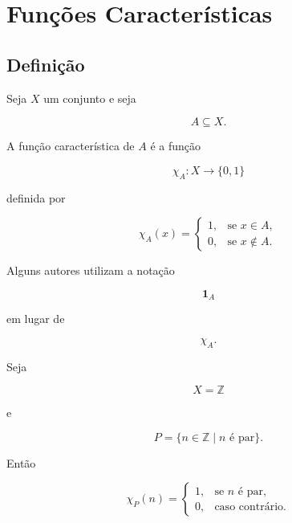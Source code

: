 \documentclass[../../main]{subfiles}
\begin{document}
\section{Funções Características}
\label{sec:matematica:funcoes:funcoes-caracteristicas}

\subsection{Definição}

\begin{defn}
	\label{def:matematica:funcoes:caracteristicas:funcao-caracteristica}

	Seja \(X\) um conjunto e seja

	\[
		A\subseteq X.
	\]

	A função característica de \(A\) é a função

	\[
		\chi_A:X\to\{0,1\}
	\]

	definida por

	\[
		\chi_A(x)
		=
		\begin{cases}
			1, & \text{se } x\in A,    \\
			0, & \text{se } x\notin A.
		\end{cases}
	\]

\end{defn}

\begin{obs}

	Alguns autores utilizam a notação

	\[
		\mathbf 1_A
	\]

	em lugar de

	\[
		\chi_A.
	\]

\end{obs}

\begin{ex}

	Seja

	\[
		X=\mathbb Z
	\]

	e

	\[
		P
		=
		\{
		n\in\mathbb Z
		\mid
		n \text{ é par}
		\}.
	\]

	Então

	\[
		\chi_P(n)
		=
		\begin{cases}
			1, & \text{se } n \text{ é par}, \\
			0, & \text{caso contrário}.
		\end{cases}
	\]

\end{ex}
\end{document}
